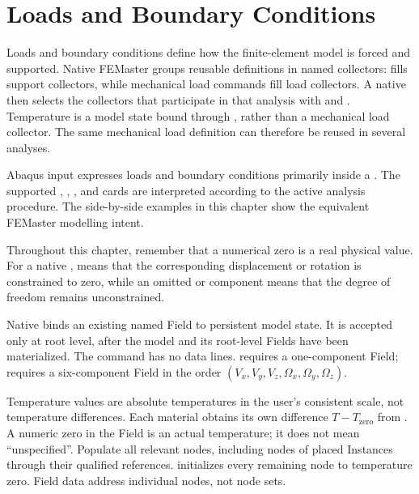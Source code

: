 \chapter{Loads and Boundary Conditions}
\label{chap:loads-bcs}

Loads and boundary conditions define how the finite-element model is forced and supported. Native FEMaster groups reusable definitions in named collectors:  fills support collectors, while mechanical load commands fill load collectors. A native  then selects the collectors that participate in that analysis with  and . Temperature is a model state bound through , rather than a mechanical load collector. The same mechanical load definition can therefore be reused in several analyses.

Abaqus input expresses loads and boundary conditions primarily inside a . The supported , , , and  cards are interpreted according to the active analysis procedure. The side-by-side examples in this chapter show the equivalent FEMaster modelling intent.

Throughout this chapter, remember that a numerical zero is a real physical value. For a native ,  means that the corresponding displacement or rotation is constrained to zero, while an omitted or  component means that the degree of freedom remains unconstrained.

\label{sec:initial-condition}

Native  binds an existing named Field to persistent model state. It is accepted only at root level, after the model and its root-level Fields have been materialized. The command has no data lines.  requires a one-component  Field;  requires a six-component  Field in the order \((V_x,V_y,V_z,\Omega_x,\Omega_y,\Omega_z)\).

Temperature values are absolute temperatures in the user's consistent scale, not temperature differences. Each material obtains its own difference \(T-T_{\mathrm{zero}}\) from . A numeric zero in the Field is an actual temperature; it does not mean ``unspecified''. Populate all relevant nodes, including nodes of placed Instances through their qualified references.  initializes every remaining node to temperature zero. Field data address individual nodes, not node sets.

